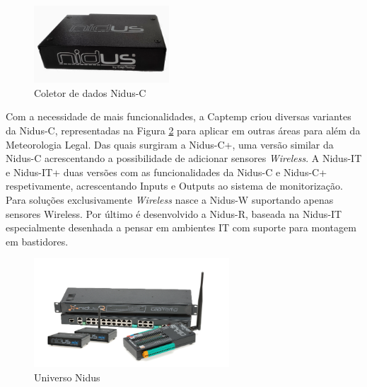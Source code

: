 \begin{figure}[ht]
  \centering
  \includegraphics[width=0.45\textwidth]{images/nidus.jpg}
  \caption{Coletor de dados Nidus-C}\label{fignidusCl}
\end{figure}

Com a necessidade de mais funcionalidades, a Captemp criou diversas variantes da Nidus-C, representadas na Figura \ref{fignidusall} para aplicar em outras áreas para além da Meteorologia Legal. Das quais surgiram a Nidus-C+, uma versão similar da Nidus-C acrescentando a possibilidade de adicionar sensores \textit{Wireless}. A Nidus-IT e Nidus-IT+ duas versões com as funcionalidades da Nidus-C e Nidus-C+ respetivamente, acrescentando Inputs e Outputs ao sistema de monitorização. Para soluções exclusivamente \textit{Wireless} nasce a Nidus-W suportando apenas sensores Wireless. Por último é desenvolvido a Nidus-R, baseada na Nidus-IT especialmente desenhada a pensar em ambientes IT com suporte para montagem em bastidores.
\par
\begin{figure}[ht]
  \centering
  \includegraphics[width=0.65\textwidth]{images/nidusall.png}
  \caption{Universo Nidus}\label{fignidusall}
\end{figure}

